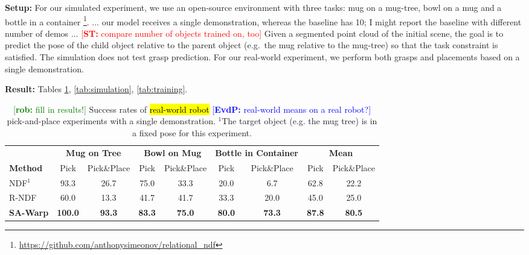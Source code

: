 \documentclass{article}
\newcommand{\evdp}[1]{\textcolor{blue}{[\textbf{EvdP:} #1]}}
\newcommand{\rob}[1]{\textcolor{green}{[\textbf{rob:} #1]}}
\newcommand{\rst}
[1]{\textcolor{red}
{[\textbf{ST:} #1]}}
\begin{document}
\textbf{Setup:} For our simulated experiment, we use an open-source environment with three tasks: mug on a mug-tree, bowl on a mug and a bottle in a  container \cite{simeonov22se}\footnote{\url{https://github.com/anthonysimeonov/relational_ndf}}. ... our model receives a single demonstration, whereas the baseline has 10; I might report the baseline with different number of demos ... \rst{compare number of objects trained on, too} Given a segmented point cloud of the initial scene, the goal is to predict the pose of the child object relative to the parent object (e.g.~the mug relative to the mug-tree) so that the task constraint is satisfied. The simulation does not test grasp prediction. For our real-world experiment, we perform both grasps and placements based on a single demonstration.

\textbf{Result:} Tables \ref{tab:real_world}, \ref{tab:simulation}, \ref{tab:training}.

\begin{table}[t!]
    \centering
    \begin{tabular}{lcccccc|cc}
         \toprule
          & \multicolumn{2}{c}{\textbf{Mug on Tree}} & \multicolumn{2}{c}{\textbf{Bowl on Mug}} & \multicolumn{2}{c}{\textbf{Bottle in Container}} & \multicolumn{2}{c}{\textbf{Mean}} \\
         \textbf{Method} & Pick & Pick\&Place & Pick & Pick\&Place & Pick & Pick\&Place & Pick & Pick\&Place \\
         \midrule
         NDF$^1$ & 93.3 & 26.7 & 75.0 & 33.3 & 20.0 & 6.7 & 62.8 & 22.2 \\
         \midrule
         R-NDF & 60.0 & 13.3 & 41.7 & 41.7 & 33.3 & 20.0 & 45.0 & 25.0 \\
         \textbf{SA-Warp} & \textbf{100.0} & \textbf{93.3} & \textbf{83.3} & \textbf{75.0} & \textbf{80.0} & \textbf{73.3} & \textbf{87.8} & \textbf{80.5} \\
         \bottomrule
    \end{tabular}
    \caption{\rob{fill in results!} Success rates of \hl{real-world robot} \evdp{real-world means on a real robot?} pick-and-place experiments with a single demonstration. $^1$The target object (e.g. the mug tree) is in a fixed pose for this experiment.}
    \label{tab:real_world}
\end{table}
\end{document}
